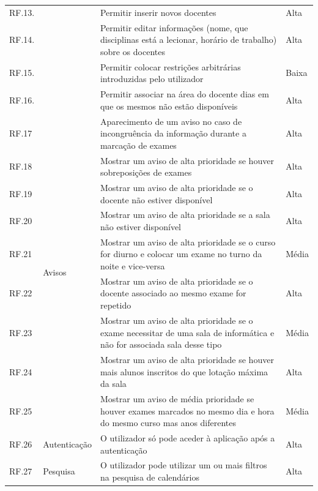 \documentclass[11pt, twoside]{report}
\begin{document}
\begin{center}
\begin{longtable}{|m{1cm}|m{2.2cm}|m{10cm}|m{2cm}|}
			RF.13. && Permitir inserir novos docentes & Alta\\
			
			RF.14. && Permitir editar informações (nome, que disciplinas está a lecionar, horário de trabalho) sobre os docentes & Alta\\
			
			RF.15. && Permitir colocar restrições arbitrárias introduzidas pelo utilizador & Baixa \\
			
			RF.16. && Permitir associar na área do docente dias em que os mesmos não estão disponíveis & Alta\\
			
			\hline
			
			RF.17 &\multirow{9}{2cm}{Avisos}& Aparecimento de um aviso no caso de incongruência da informação durante a marcação de exames & Alta \\
			
			RF.18 &&Mostrar um aviso de alta prioridade se houver sobreposições de exames & Alta\\
			
			RF.19 && Mostrar um aviso de alta prioridade se o docente não estiver disponível & Alta \\
			
			RF.20 && Mostrar um aviso de alta prioridade se a sala não estiver disponível & Alta\\
			
			RF.21 && Mostrar um aviso de alta prioridade se o curso for diurno e colocar um exame no turno da noite e vice-versa & Média\\
			
			RF.22&&Mostrar um aviso de alta prioridade se o docente associado ao mesmo exame for repetido & Alta \\
			
			RF.23 && Mostrar um aviso de alta prioridade se o exame necessitar de uma sala de informática e não for associada sala desse tipo & Média\\
			
			RF.24 && Mostrar um aviso de alta prioridade se houver mais alunos inscritos do que  lotação máxima da sala & Alta\\
			
			RF.25 && Mostrar um aviso de média prioridade se houver exames marcados no mesmo dia e hora do mesmo curso mas anos diferentes & Média\\
			\hline
			
			RF.26 &Autenticação& O utilizador só pode aceder à aplicação após a autenticação & Alta\\
			\hline
			RF.27 &\multirow{2}{*}{Pesquisa}& O utilizador pode utilizar um ou mais filtros na pesquisa de calendários & Alta\\
		

\end{longtable}
\end{center}
\end{document}
